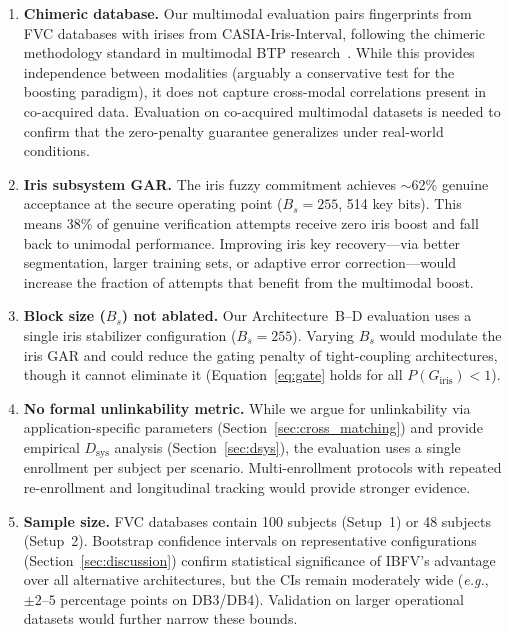 \documentclass[conference]{IEEEtran}
\newcommand{\IBFV}{\textsf{IBFV}}
\newcommand{\eg}{\textit{e.g.}}
\begin{document}
\begin{enumerate}
    \item \textbf{Chimeric database.} Our multimodal evaluation pairs fingerprints from FVC databases with irises from CASIA-Iris-Interval, following the chimeric methodology standard in multimodal BTP research~\cite{ross2003information,nandakumar2008multibiometric}. While this provides independence between modalities (arguably a conservative test for the boosting paradigm), it does not capture cross-modal correlations present in co-acquired data. Evaluation on co-acquired multimodal datasets is needed to confirm that the zero-penalty guarantee generalizes under real-world conditions.
    \item \textbf{Iris subsystem GAR.} The iris fuzzy commitment achieves $\sim$62\% genuine acceptance at the secure operating point ($B_s = 255$, 514 key bits). This means 38\% of genuine verification attempts receive zero iris boost and fall back to unimodal performance. Improving iris key recovery---via better segmentation, larger training sets, or adaptive error correction---would increase the fraction of attempts that benefit from the multimodal boost.
    \item \textbf{Block size ($B_s$) not ablated.} Our Architecture~B--D evaluation uses a single iris stabilizer configuration ($B_s = 255$). Varying $B_s$ would modulate the iris GAR and could reduce the gating penalty of tight-coupling architectures, though it cannot eliminate it (Equation~\ref{eq:gate} holds for all $P(G_{\text{iris}}) < 1$).
    \item \textbf{No formal unlinkability metric.} While we argue for unlinkability via application-specific parameters (Section~\ref{sec:cross_matching}) and provide empirical $D_{\text{sys}}$ analysis (Section~\ref{sec:dsys}), the evaluation uses a single enrollment per subject per scenario. Multi-enrollment protocols with repeated re-enrollment and longitudinal tracking would provide stronger evidence.
    \item \textbf{Sample size.} FVC databases contain 100 subjects (Setup~1) or 48 subjects (Setup~2). Bootstrap confidence intervals on representative configurations (Section~\ref{sec:discussion}) confirm statistical significance of \IBFV{}'s advantage over all alternative architectures, but the CIs remain moderately wide (\eg{}, $\pm 2$--$5$ percentage points on DB3/DB4). Validation on larger operational datasets would further narrow these bounds.
\end{enumerate}
\end{document}
